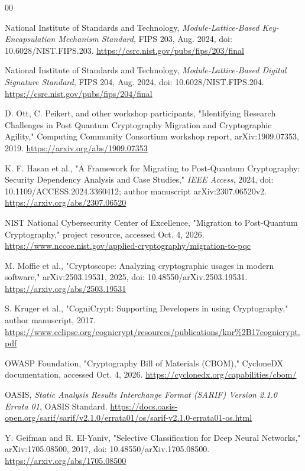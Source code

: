 \documentclass[conference,a4paper]{IEEEtran}
\begin{document}
\begin{thebibliography}{00}

National Institute of Standards and Technology, \emph{Module-Lattice-Based Key-Encapsulation Mechanism Standard}, FIPS 203, Aug. 2024, doi: 10.6028/NIST.FIPS.203. \url{https://csrc.nist.gov/pubs/fips/203/final}

National Institute of Standards and Technology, \emph{Module-Lattice-Based Digital Signature Standard}, FIPS 204, Aug. 2024, doi: 10.6028/NIST.FIPS.204. \url{https://csrc.nist.gov/pubs/fips/204/final}

D. Ott, C. Peikert, and other workshop participants, "Identifying Research Challenges in Post Quantum Cryptography Migration and Cryptographic Agility," Computing Community Consortium workshop report, arXiv:1909.07353, 2019. \url{https://arxiv.org/abs/1909.07353}

K. F. Hasan et al., "A Framework for Migrating to Post-Quantum Cryptography: Security Dependency Analysis and Case Studies," \emph{IEEE Access}, 2024, doi: 10.1109/ACCESS.2024.3360412; author manuscript arXiv:2307.06520v2. \url{https://arxiv.org/abs/2307.06520}

NIST National Cybersecurity Center of Excellence, "Migration to Post-Quantum Cryptography," project resource, accessed Oct. 4, 2026. \url{https://www.nccoe.nist.gov/applied-cryptography/migration-to-pqc}

M. Moffie et al., "Cryptoscope: Analyzing cryptographic usages in modern software," arXiv:2503.19531, 2025, doi: 10.48550/arXiv.2503.19531. \url{https://arxiv.org/abs/2503.19531}

S. Kruger et al., "CogniCrypt: Supporting Developers in using Cryptography," author manuscript, 2017. \url{https://www.eclipse.org/cognicrypt/resources/publications/knr%2B17cognicrypt.pdf}

OWASP Foundation, "Cryptography Bill of Materials (CBOM)," CycloneDX documentation, accessed Oct. 4, 2026. \url{https://cyclonedx.org/capabilities/cbom/}

OASIS, \emph{Static Analysis Results Interchange Format (SARIF) Version 2.1.0 Errata 01}, OASIS Standard. \url{https://docs.oasis-open.org/sarif/sarif/v2.1.0/errata01/os/sarif-v2.1.0-errata01-os.html}

Y. Geifman and R. El-Yaniv, "Selective Classification for Deep Neural Networks," arXiv:1705.08500, 2017, doi: 10.48550/arXiv.1705.08500. \url{https://arxiv.org/abs/1705.08500}


\end{thebibliography}
\end{document}
